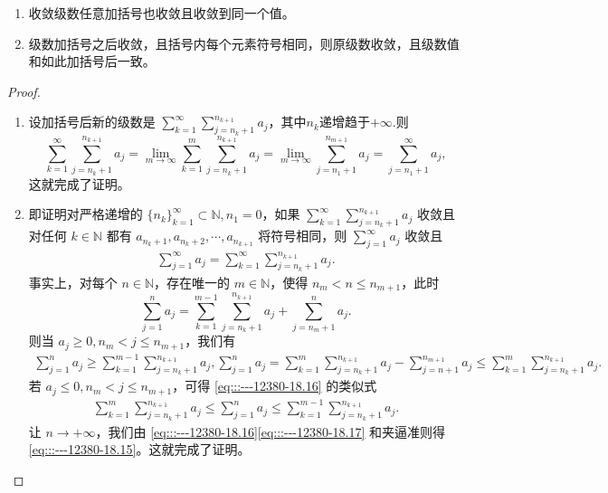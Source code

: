 \documentclass[../../main.tex]{subfiles}%
\begin{document}
\begin{theorem}[级数加括号的理解]\label{theorem:级数加括号的理解}
\begin{enumerate}
\item 收敛级数任意加括号也收敛且收敛到同一个值。

\item 级数加括号之后收敛，且括号内每个元素符号相同，则原级数收敛，且级数值和如此加括号后一致。
\end{enumerate}
\end{theorem}
\begin{proof}
\begin{enumerate}
\item 设加括号后新的级数是 \( \sum_{k = 1}^{\infty} \sum_{j = n_k + 1}^{n_{k + 1}} a_j \)，其中$n_k$递增趋于$+\infty.$则
\[
\sum_{k = 1}^{\infty} \sum_{j = n_k + 1}^{n_{k + 1}} a_j = \lim_{m \to \infty} \sum_{k = 1}^{m} \sum_{j = n_k + 1}^{n_{k + 1}} a_j = \lim_{m \to \infty} \sum_{j = n_1 + 1}^{n_{m + 1}} a_j = \sum_{j = n_1 + 1}^{\infty} a_j,
\]
这就完成了证明。

\item 即证明对严格递增的 \( \{n_k\}_{k = 1}^{\infty} \subset \mathbb{N}, n_1 = 0 \)，如果 \( \sum_{k = 1}^{\infty} \sum_{j = n_k + 1}^{n_{k + 1}} a_j \) 收敛且对任何 \( k \in \mathbb{N} \) 都有 \( a_{n_k + 1}, a_{n_k + 2}, \cdots, a_{n_{k + 1}} \) 将符号相同，则 \( \sum_{j = 1}^{\infty} a_j \) 收敛且
\begin{align}
\sum_{j = 1}^{\infty} a_j = \sum_{k = 1}^{\infty} \sum_{j = n_k + 1}^{n_{k + 1}} a_j. \label{eq:::---12380-18.15}
\end{align}
事实上，对每个 \( n \in \mathbb{N} \)，存在唯一的 \( m \in \mathbb{N} \)，使得 \( n_m < n \leqslant n_{m + 1} \)，此时
\[
\sum_{j = 1}^{n} a_j = \sum_{k = 1}^{m - 1} \sum_{j = n_k + 1}^{n_{k + 1}} a_j + \sum_{j = n_m + 1}^{n} a_j.
\]
则当 \( a_j \geqslant 0, n_m < j \leqslant n_{m + 1} \)，我们有
\begin{align}
\sum_{j = 1}^{n} a_j \geqslant \sum_{k = 1}^{m - 1} \sum_{j = n_k + 1}^{n_{k + 1}} a_j, \sum_{j = 1}^{n} a_j = \sum_{k = 1}^{m} \sum_{j = n_k + 1}^{n_{k + 1}} a_j - \sum_{j = n + 1}^{n_{m + 1}} a_j \leqslant \sum_{k = 1}^{m} \sum_{j = n_k + 1}^{n_{k + 1}} a_j. \label{eq:::---12380-18.16}
\end{align}
若 \( a_j \leqslant 0, n_m < j \leqslant n_{m + 1} \)，可得 \eqref{eq:::---12380-18.16} 的类似式
\begin{align}
\sum_{k = 1}^{m} \sum_{j = n_k + 1}^{n_{k + 1}} a_j \leqslant \sum_{j = 1}^{n} a_j \leqslant \sum_{k = 1}^{m - 1} \sum_{j = n_k + 1}^{n_{k + 1}} a_j. \label{eq:::---12380-18.17}
\end{align}
让 \( n \to +\infty \)，我们由 \eqref{eq:::---12380-18.16}\eqref{eq:::---12380-18.17} 和夹逼准则得 \eqref{eq:::---12380-18.15}。这就完成了证明。
\end{enumerate}

\end{proof}
\end{document}
